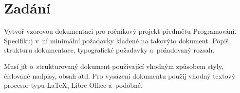 \chapter{Zadání}
Vytvoř vzorovou dokumentaci pro ročníkový projekt předmětu Programování. Specifikuj v~ní minimální požadavky kladené na takovýto dokument. Popiš strukturu dokumentace, typografické požadavky a~požadovaný rozsah. 

Musí jít o~strukturovaný dokument používající vhodným způsobem styly, číslované nadpisy, obsah atd.
Pro vysázení dokumentu použij vhodný textový procesor typu {\LaTeX}, Libre Office a~podobné.
